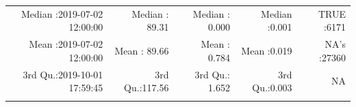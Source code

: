 \documentclass[
  10pt,
  a4paper,oneside]{article}
\begin{document}
\begin{longtable}[]{@{}rrrrr@{}}
\begin{minipage}[t]{0.27\columnwidth}\raggedleft
Median :2019-07-02 12:00:00\strut
\end{minipage} & \begin{minipage}[t]{0.15\columnwidth}\raggedleft
Median : 89.31\strut
\end{minipage} & \begin{minipage}[t]{0.15\columnwidth}\raggedleft
Median : 0.000\strut
\end{minipage} & \begin{minipage}[t]{0.14\columnwidth}\raggedleft
Median :0.001\strut
\end{minipage} & \begin{minipage}[t]{0.14\columnwidth}\raggedleft
TRUE :6171\strut
\end{minipage}\tabularnewline
\begin{minipage}[t]{0.27\columnwidth}\raggedleft
Mean :2019-07-02 12:00:00\strut
\end{minipage} & \begin{minipage}[t]{0.15\columnwidth}\raggedleft
Mean : 89.66\strut
\end{minipage} & \begin{minipage}[t]{0.15\columnwidth}\raggedleft
Mean : 0.784\strut
\end{minipage} & \begin{minipage}[t]{0.14\columnwidth}\raggedleft
Mean :0.019\strut
\end{minipage} & \begin{minipage}[t]{0.14\columnwidth}\raggedleft
NA's :27360\strut
\end{minipage}\tabularnewline
\begin{minipage}[t]{0.27\columnwidth}\raggedleft
3rd Qu.:2019-10-01 17:59:45\strut
\end{minipage} & \begin{minipage}[t]{0.15\columnwidth}\raggedleft
3rd Qu.:117.56\strut
\end{minipage} & \begin{minipage}[t]{0.15\columnwidth}\raggedleft
3rd Qu.: 1.652\strut
\end{minipage} & \begin{minipage}[t]{0.14\columnwidth}\raggedleft
3rd Qu.:0.003\strut
\end{minipage} & \begin{minipage}[t]{0.14\columnwidth}\raggedleft
NA\strut
\end{minipage}\tabularnewline
\begin{minipage}[t]{0.27\columnwidth}\raggedleft

\end{minipage}
\end{longtable}
\end{document}
